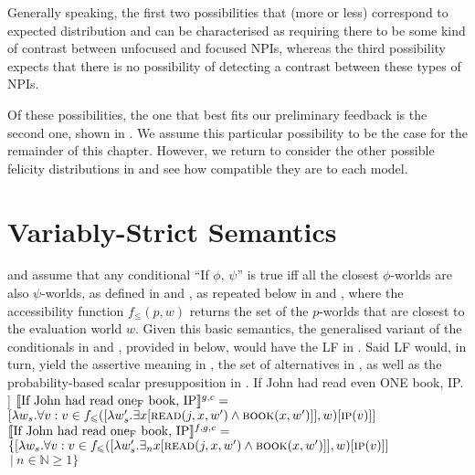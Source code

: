 Generally speaking, the first two possibilities that (more or less) correspond to  expected distribution and can be characterised as requiring there to be some kind of contrast between unfocused and focused NPIs, whereas the third possibility expects that there is no possibility of detecting a contrast between these types of NPIs.

Of these possibilities, the one that best fits our preliminary feedback is the second one, shown in . We assume this particular possibility to be the case for the remainder of this chapter. However, we return to consider the other possible felicity distributions in  and see how compatible they are to each model.

\section{Variably-Strict Semantics}
\textcite{Stalnaker1968} and \textcite{Lewis1973} assume that any conditional \enquote{If $\phi$, $\psi$} is true iff all the closest $\phi$-worlds are also $\psi$-worlds, as defined in  and , as repeated below in  and , where the accessibility function $f_\leqslant(p,w)$ returns the set of the $p$-worlds that are closest to the evaluation world $w$.
\ex{}\xe
\ex{}\xe
Given this basic semantics, the generalised variant of the conditionals in  and , provided in  below, would have the LF in . Said LF would, in turn, yield the assertive meaning in , the set of alternatives in , as well as the probability-based scalar presupposition in .
\pex[nopreamble=true]\label{ex:vs-neutral-conditional}%
\a{} If John had read even \MakeUppercase{one} book, IP.
\a[]\phantomsection [even\textsubscript{C} [If John had read one\textsubscript{F} book IP]]
\a{} $\intension[g,c]{If John had read one\textsubscript{F} book, IP}=$\\$[\lambda w_s.\forall v:v\in f_\leqslant([\lambda w'_s.\exists{x}[\predicate{read}(j,x,w')\land\predicate{book}(x,w')]],w)[\predicate{ip}(v)]]$
\a{} $\intension[f,g,c]{If John had read one\textsubscript{F} book, IP}=$\\$\{[\lambda w_s.\forall v:v\in f_\leqslant([\lambda w'_s.\exists_n{x}[\predicate{read}(j,x,w')\land\predicate{book}(x,w')]],w)[\predicate{ip}(v)]]$\\\emptyfill$~|~n\in\mathbb{N}\geqslant1\}$
\xe

